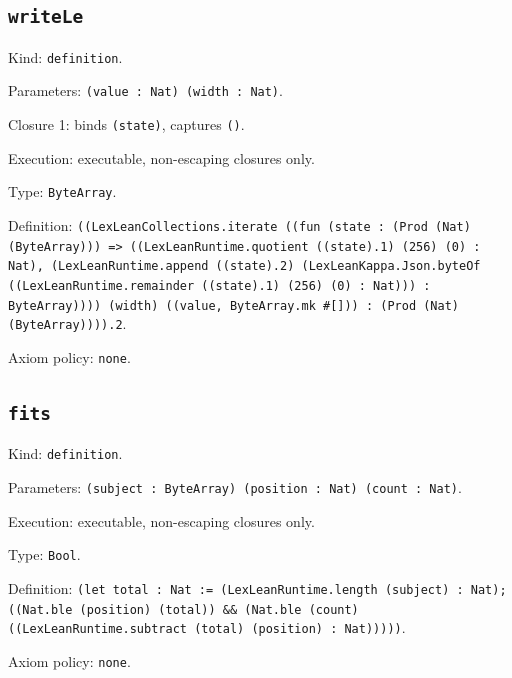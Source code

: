 \documentclass[11pt]{article}
\begin{document}
\subsection*{\texttt{writeLe}}
\noindent Kind: \texttt{definition}.\par
\noindent Parameters: \texttt{(value : Nat) (width : Nat)}.\par
\noindent Closure 1: binds \texttt{(state)}, captures \texttt{()}.\par
\noindent Execution: executable, non-escaping closures only.\par
\noindent Type: \texttt{ByteArray}.\par
\noindent Definition: \texttt{((LexLeanCollections.iterate ((fun (state : (Prod (Nat) (ByteArray))) => ((LexLeanRuntime.quotient ((state).1) (256) (0) : Nat), (LexLeanRuntime.append ((state).2) (LexLeanKappa.Json.byteOf ((LexLeanRuntime.remainder ((state).1) (256) (0) : Nat))) : ByteArray)))) (width) ((value, ByteArray.mk \#[])) : (Prod (Nat) (ByteArray)))).2}.\par
\noindent Axiom policy: \texttt{none}.\par
\subsection*{\texttt{fits}}
\noindent Kind: \texttt{definition}.\par
\noindent Parameters: \texttt{(subject : ByteArray) (position : Nat) (count : Nat)}.\par
\noindent Execution: executable, non-escaping closures only.\par
\noindent Type: \texttt{Bool}.\par
\noindent Definition: \texttt{(let total : Nat := (LexLeanRuntime.length (subject) : Nat); ((Nat.ble (position) (total)) \&\& (Nat.ble (count) ((LexLeanRuntime.subtract (total) (position) : Nat)))))}.\par
\noindent Axiom policy: \texttt{none}.\par
\end{document}

